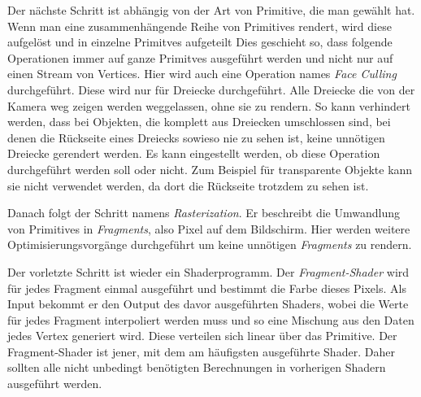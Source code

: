 Der nächste Schritt ist abhängig von der Art von Primitive, die man gewählt hat. Wenn man eine zusammenhängende Reihe von Primitives rendert, wird diese aufgelöst und in einzelne Primitves aufgeteilt Dies geschieht so, dass folgende Operationen immer auf ganze Primitves ausgeführt werden und nicht nur auf einen Stream von Vertices. 
Hier wird auch eine Operation names \textit{Face Culling} durchgeführt. Diese wird nur für Dreiecke durchgeführt. Alle Dreiecke die von der Kamera weg zeigen werden weggelassen, ohne sie zu rendern. So kann verhindert werden, dass bei Objekten, die komplett aus Dreiecken umschlossen sind, bei denen die Rückseite eines Dreiecks sowieso nie zu sehen ist, keine unnötigen Dreiecke gerendert werden. Es kann eingestellt werden, ob diese Operation durchgeführt werden soll oder nicht. Zum Beispiel für transparente Objekte kann sie nicht verwendet werden, da dort die Rückseite trotzdem zu sehen ist.

Danach folgt der Schritt namens \textit{Rasterization}. Er beschreibt die Umwandlung von Primitives in \textit{Fragments}, also Pixel auf dem Bildschirm. Hier werden weitere Optimisierungsvorgänge durchgeführt um keine unnötigen \textit{Fragments} zu rendern.

Der vorletzte Schritt ist wieder ein Shaderprogramm. Der \textit{Fragment-Shader} wird für jedes Fragment einmal ausgeführt und bestimmt die Farbe dieses Pixels. Als Input bekommt er den Output des davor ausgeführten Shaders, wobei die Werte für jedes Fragment interpoliert werden muss und so eine Mischung aus den Daten jedes Vertex generiert wird. Diese verteilen sich linear über das Primitive. Der Fragment-Shader ist jener, mit dem am häufigsten ausgeführte Shader. Daher sollten alle nicht unbedingt benötigten Berechnungen in vorherigen Shadern ausgeführt werden.

